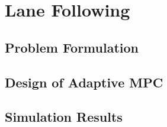 \chapter{Lane Following}
\section{Problem Formulation}
\section{Design of Adaptive MPC}
\section{Simulation Results}
